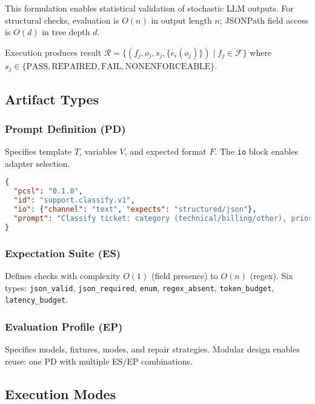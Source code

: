 \documentclass[sigconf]{acmart}
\begin{document}
This formulation enables statistical validation of stochastic LLM outputs. For structural checks, evaluation is \(O(n)\) in output length \(n\); JSONPath field access is \(O(d)\) in tree depth \(d\).

Execution produces result \( \mathcal{R} = \{(f_j, o_j, s_j, \{e_i(o_j)\}) \mid f_j \in \mathcal{F}\} \) where \( s_j \in \{\text{PASS}, \text{REPAIRED}, \text{FAIL}, \text{NONENFORCEABLE}\} \).

\subsection{Artifact Types}

\subsubsection{Prompt Definition (PD)}
Specifies template \( T \), variables \( V \), and expected format \( F \). The \texttt{io} block enables adapter selection.

\begin{samepage}
\begin{lstlisting}[language=json, caption=Prompt Definition, label=lst:pd]
{
  "pcsl": "0.1.0",
  "id": "support.classify.v1",
  "io": {"channel": "text", "expects": "structured/json"},
  "prompt": "Classify ticket: category (technical/billing/other), priority (low/medium/high). Output JSON: {category, priority, reason}."
}
\end{lstlisting}
\end{samepage}

\subsubsection{Expectation Suite (ES)}
Defines checks with complexity \( O(1) \) (field presence) to \( O(n) \) (regex). Six types: \texttt{json\_valid}, \texttt{json\_required}, \texttt{enum}, \texttt{regex\_absent}, \texttt{token\_budget}, \texttt{latency\_budget}.

\subsubsection{Evaluation Profile (EP)}
Specifies models, fixtures, modes, and repair strategies. Modular design enables reuse: one PD with multiple ES/EP combinations.

\subsection{Execution Modes}
\end{document}

